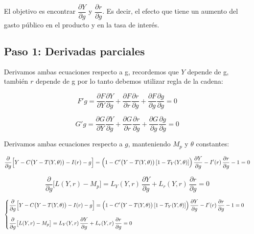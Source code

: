 \documentclass{article}
\begin{document}
El objetivo es encontrar $\dfrac{\partial Y}{\partial g}$ y $\dfrac{\partial r}{\partial g}$. Es decir, el efecto que tiene un aumento del gasto público en el producto y en la tasa de interés.



\subsection*{Paso 1: Derivadas parciales}

Derivamos ambas ecuaciones respecto a g, recordemos que $Y$ depende de g, también $r$ depende de g por lo tanto debemos utilizar regla de la cadena:

\begin{equation*}
F'g= \dfrac{\partial F}{\partial Y} \dfrac{\partial Y}{\partial g} +\dfrac{\partial F}{\partial r} \dfrac{\partial r}{\partial g} + \dfrac{\partial F}{\partial g} \dfrac{\partial g}{\partial g} =0
\end{equation*}


\begin{equation*}
G'g= \dfrac{\partial G}{\partial Y} \dfrac{\partial Y}{\partial g} +\dfrac{\partial G}{\partial r} \dfrac{\partial r}{\partial g} + \dfrac{\partial G}{\partial g} \dfrac{\partial g}{\partial g} =0
\end{equation*}


Derivamos ambas ecuaciones respecto a \(g\), manteniendo \(M_p\) y \(\theta\) constantes:

\[
\frac{\partial}{\partial g}\Bigl[Y - C\bigl(Y - T(Y,\theta)\bigr) - I(r) - g\Bigr]
= \Bigl(1 - C'\bigl(Y - T(Y,\theta)\bigr)\,[1 - T_Y(Y,\theta)]\Bigr)\,\frac{\partial Y}{\partial g}
- I'(r)\,\frac{\partial r}{\partial g}
- 1
= 0
\]

\[
\frac{\partial}{\partial g}\bigl[L(Y,r) - M_p\bigr]
= L_Y(Y,r)\,\frac{\partial Y}{\partial g}
+ L_r(Y,r)\,\frac{\partial r}{\partial g}
= 0
\]


\[
\begin{cases}
\displaystyle
\frac{\partial}{\partial g}\Bigl[Y - C\bigl(Y - T(Y,\theta)\bigr) - I(r) - g\Bigr]
= \Bigl(1 - C'\bigl(Y - T(Y,\theta)\bigr)\,[1 - T_Y(Y,\theta)]\Bigr)\,\dfrac{\partial Y}{\partial g}
- I'(r)\,\dfrac{\partial r}{\partial g}
- 1
= 0\\[1.5em]
\displaystyle
\frac{\partial}{\partial g}\bigl[L(Y,r) - M_p\bigr]
= L_Y(Y,r)\,\dfrac{\partial Y}{\partial g}
+ L_r(Y,r)\,\dfrac{\partial r}{\partial g}
= 0
\end{cases}
\]
\end{document}
